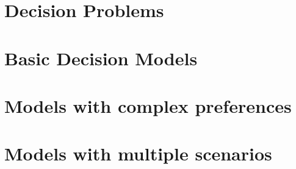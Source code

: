 \documentclass[11pt]{report}
\begin{document}
	\maketitle
	\tableofcontents
	\newpage	
	
	\part{Decision Problems}
	
	
	
	
	
	\part{Basic Decision Models}
	
	
	
	
	\part{Models with complex preferences}
	
	
	
	
	\part{Models with multiple scenarios}
	
	
	
	
	
\end{document}
